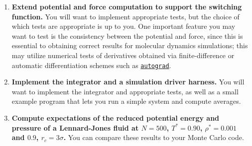 \documentclass[aip,jcp,preprint,superscriptaddress,floatfix]{revtex4-1}
\begin{document}
\begin{enumerate}
\setlength{\itemsep}{0em} %
\item \textbf{Extend potential and force computation to support the switching function.}
You will want to implement appropriate tests, but the choice of which tests are appropriate is up to you.
One important feature you may want to test is the consistency between the potential and force, since this is essential to obtaining correct results for molecular dynamics simulations; this may utilize numerical tests of derivatives obtained via finite-difference or automatic differentiation schemes such as \href{https://github.com/HIPS/autograd}{\tt autograd}.

\item \textbf{Implement the integrator and a simulation driver harness.}
You will want to implement the integrator and appropriate tests, as well as a small example program that lets you run a simple system and compute averages.

\item \textbf{Compute expectations of the reduced potential energy and pressure of a Lennard-Jones fluid at $N=500$, $T^*= 0.90$, $\rho^* = 0.001$ and $0.9$, $r_c = 3\sigma$.}
You can compare these results to your Monte Carlo code.


\end{enumerate}
\end{document}

